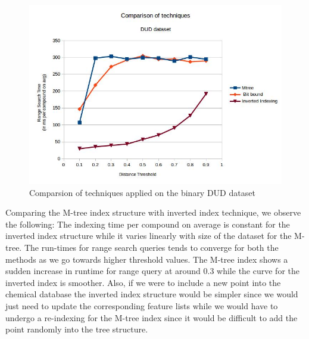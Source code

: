 \begin{figure}[ht!]	
\centering
\includegraphics[width=0.75 \columnwidth]{img/imageC3.jpg}
\caption{Comparsion of techniques applied on the binary DUD dataset}
\label{fig:5C3}
\end{figure}

Comparing the M-tree index structure with inverted index technique, we observe the following: The indexing time  per compound on average is constant for the inverted index structure while it varies linearly with size of the dataset for the M-tree. The run-times for range search queries tends to converge for both the methods as we go towards higher threshold values. The M-tree index shows a sudden increase in runtime for range query at around 0.3 while the curve for the inverted index is smoother. Also, if we were to include a new point into the chemical database the inverted index structure would be simpler since we would just need to update the corresponding feature lists while we would have to undergo a re-indexing for the M-tree index since it would be difficult to add the point randomly into the tree structure.

